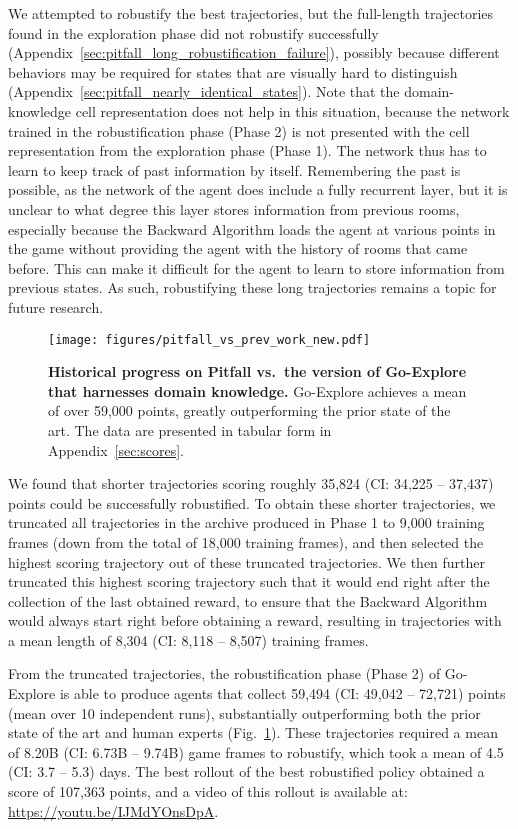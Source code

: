 \documentclass{article}
\newcommand{\pivotci}[2]{(CI: #1 -- #2)}  \newcommand{\percci}[2]{}  \newcommand{\tpivotci}[2]{(#1 -- #2)}  \newcommand{\tpercci}[2]{}  \newcommand{\na}[0]{-}
\begin{document}
We attempted to robustify the best trajectories, but the full-length trajectories found in the exploration phase did not robustify successfully (Appendix~\ref{sec:pitfall_long_robustification_failure}), possibly because different behaviors may be required for states that are visually hard to distinguish (Appendix~\ref{sec:pitfall_nearly_identical_states}). Note that the domain-knowledge cell representation does not help in this situation, because the network trained in the robustification phase (Phase 2) is not presented with the cell representation from the exploration phase (Phase 1). The network thus has to learn to keep track of past information by itself. Remembering the past is possible, as the network of the agent does include a fully recurrent layer, but it is unclear to what degree this layer stores information from previous rooms, especially because the Backward Algorithm loads the agent at various points in the game without providing the agent with the history of rooms that came before. This can make it difficult for the agent to learn to store information from previous states. As such, robustifying these long trajectories remains a topic for future research.

\begin{figure}
    \centering
    \texttt{[image: figures/pitfall\_vs\_prev\_work\_new.pdf]}
    \caption{\textbf{Historical progress on Pitfall vs.\ the version of Go-Explore that harnesses domain knowledge.} Go-Explore achieves a mean of over 59,000 points, greatly outperforming the prior state of the art. The data are presented in tabular form in Appendix~\ref{sec:scores}.}
    \label{fig:pitfall_history}
\end{figure}

We found that shorter trajectories scoring roughly 35,824 \pivotci{34,225}{37,437}\percci{34,196}{37,429} points could be successfully robustified. To obtain these shorter trajectories, we truncated all trajectories in the archive produced in Phase 1 to 9,000 training frames (down from the total of 18,000 training frames), and then selected the highest scoring trajectory out of these truncated trajectories. We then further truncated this highest scoring trajectory such that it would end right after the collection of the last obtained reward, to ensure that the Backward Algorithm would always start right before obtaining a reward, resulting in trajectories with a mean length of 8,304 \pivotci{8,118}{8,507}\percci{8,100}{8,491} training frames.

From the truncated trajectories, the robustification phase (Phase 2) of Go-Explore is able to produce agents that collect 59,494 \pivotci{49,042}{72,721}\percci{46,044}{69,987} points (mean over 10 independent runs), substantially outperforming both the prior state of the art and human experts (Fig.~\ref{fig:pitfall_history}). These trajectories required a mean of 8.20B \pivotci{6.73B}{9.74B}\percci{6.63B}{9.70B} game frames to robustify, which took a mean of 4.5 \pivotci{3.7}{5.3}\percci{3.6}{5.3} days. The best rollout of the best robustified policy obtained a score of 107,363 points, and a video of this rollout is available at: \url{https://youtu.be/IJMdYOnsDpA}.
\end{document}
